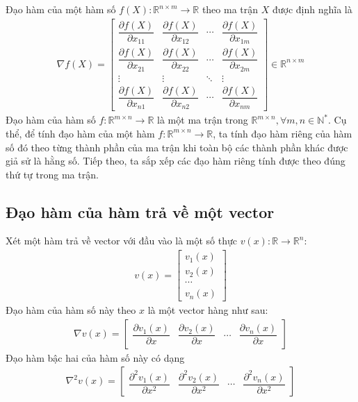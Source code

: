\documentclass[12pt,a4paper]{report}
\begin{document}
Đạo hàm của một hàm số $f(X): \mathbb{R}^{n \times m} \rightarrow \mathbb{R}$ theo ma trận $X$ được định nghĩa là \begin{eqnarray}
	\nabla f(X) = \begin{bmatrix}
			\dfrac{\partial f(X)}{\partial x_{11}}&\dfrac{\partial f(X)}{\partial x_{12}}&\cdots&\dfrac{\partial f(X)}{\partial x_{1m}} \\ 	\dfrac{\partial f(X)}{ \partial x_{21}}&\dfrac{\partial f(X)}{\partial x_{22}}&\cdots&\dfrac{\partial f(X)}{\partial x_{2m}} \\ \vdots & \vdots& \ddots& \vdots \\ 	\dfrac{\partial f(X)}{\partial x_{n1}}&\dfrac{\partial f(X)}{\partial x_{n2}}&\cdots&\dfrac{\partial f(X)}{\partial x_{nm}}
	\end{bmatrix} \in \mathbb{R}^{n \times m}
\end{eqnarray} 
Đạo hàm của hàm số $f: \mathbb{R}^{m \times n} \to \mathbb{R}$ là một ma trận trong $\mathbb{R}^{m \times n}, \forall m, n \in \mathbb{N}^*$. Cụ thể, để tính đạo hàm của một hàm $f: \mathbb{R}^{m \times n} \to \mathbb{R}$, ta tính đạo hàm riêng của hàm số đó theo từng thành phần của ma trận khi toàn bộ các thành phần khác được giả sử là hằng số. Tiếp theo, ta sắp xếp các đạo hàm riêng tính được theo đúng thứ tự trong ma trận.

\subsection{Đạo hàm của hàm trả về một vector}
Xét một hàm trả về vector với đầu vào là một số thực $v(x): \mathbb{R} \to \mathbb{R}^n$: \begin{eqnarray}
	v(x) = \begin{bmatrix}
	v_1(x)\\v_2(x)\\ \cdots \\ v_n(x)
	\end{bmatrix}
\end{eqnarray} Đạo hàm của hàm số này theo $x$ là một vector hàng như sau: \begin{eqnarray}
	\nabla v(x) = \begin{bmatrix}
	\dfrac{\partial v_1(x)}{\partial x} & 	\dfrac{\partial v_2(x)}{\partial x} & \cdots & 	\dfrac{\partial v_n(x)}{\partial x}
	\end{bmatrix}
\end{eqnarray} Đạo hàm bậc hai của hàm số này có dạng \begin{eqnarray}
	\nabla^2 v(x) = \begin{bmatrix}
	\dfrac{\partial^2 v_1(x)}{\partial x^2} & 	\dfrac{\partial^2 v_2(x)}{\partial x^2} & \cdots & 	\dfrac{\partial^2 v_n(x)}{\partial x^2}
	\end{bmatrix}
\end{eqnarray}
\end{document}
